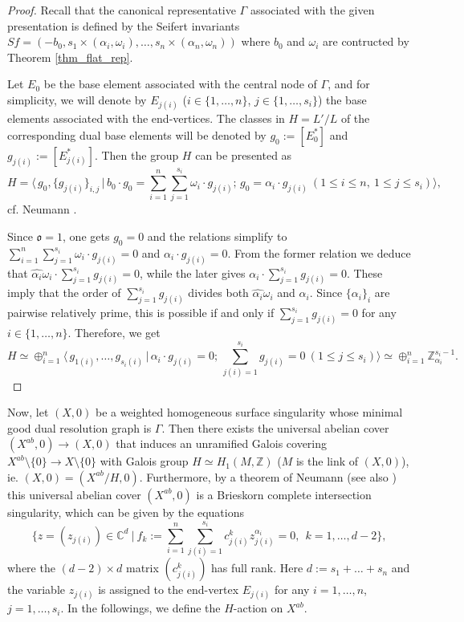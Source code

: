 \documentclass[oneside]{amsart}
\numberwithin{equation}{section}
\numberwithin{equation}{subsection}
\theoremstyle{plain}
\theoremstyle{definition}
\def\C{\mathbb C}
\def\Z{\mathbb Z}
\newcommand{\w}{\omega}
\newcommand{\al}{\alpha}
\renewcommand{\Z}{\mathbb{Z}}
\newcommand{\oo}{\mathfrak{o}}
\newcommand{\z}[1]{\widehat{#1}}
\begin{document}
\begin{proof}
Recall that the canonical representative $\Gamma$ associated with the given  presentation  is defined by the Seifert invariants $Sf=(-b_0, s_1\times (\al_i,\w_i),\dots,s_n\times (\al_n,\w_n))$ where $b_0$ and $\w_i$ are contructed by Theorem \ref{thm_flat_rep}.

Let $E_0$ be the base element associated with the central node of $\Gamma$, and for simplicity, we will denote by $E_{j(i)}$ ($i\in\{1,\dots,n\}$, $j\in\{1,\dots,s_i\}$) the base elements associated with the end-vertices. The classes in $H= L'/L$ of the corresponding dual base elements will be denoted by $g_0:=[E^*_0]$ and $g_{j(i)}:=[E^*_{j(i)}]$. Then the group $H$ can be presented as 
$$H=\big\langle \, g_0,\{g_{j(i)}\}_{i,j}\,|\, b_0\cdot g_0=\sum_{i=1}^n\sum_{j=1}^{s_i} \omega_i\cdot g_{j(i)};
\, g_0=\alpha_i\cdot g_{j(i)}\ (1\leq i\leq n, \ 1\leq j\leq s_i)\big\rangle,$$
cf. Neumann \cite{neumann.abel}. 

Since $\oo=1$, one gets $g_0=0$ and the relations simplify to  $\sum_{i=1}^n\sum_{j=1}^{s_i} \omega_i\cdot g_{j(i)}=0$ and $\alpha_i\cdot g_{j(i)}=0$. From the former relation we deduce that $\z{\al_i}\w_i\cdot \sum_{j=1}^{s_i}g_{j(i)}=0$, while the later gives $\al_i\cdot \sum_{j=1}^{s_i}g_{j(i)}=0$. These imply that the order of $\sum_{j=1}^{s_i}g_{j(i)}$ divides both $\z{\al_i}\w_i$ and $\al_i$. Since $\{\al_i\}_i$ are pairwise relatively prime, this is possible if and only if $\sum_{j=1}^{s_i}g_{j(i)}=0$ for any $i\in\{1,\dots, n\}$. Therefore, we get 
\begin{equation}\label{eq:Hrel}
H\simeq \oplus_{i=1}^n\langle \, g_{1(i)},\dots,g_{s_i(i)}\,|\, \alpha_i\cdot g_{j(i)}=0;
\, \sum_{j(i)=1}^{s_i}g_{j(i)}=0\ (1\leq j\leq s_i)\rangle\simeq \oplus_{i=1}^n \Z_{\al_i}^{s_i-1}.
\end{equation}
\end{proof}

Now, let $(X,0)$ be a weighted homogeneous surface singularity whose minimal good dual resolution graph is $\Gamma$. Then there exists the universal abelian cover $(X^{ab},0)\to (X,0)$ that induces an unramified Galois covering $X^{ab}\setminus\{0\} \to X\setminus\{0\}$ with Galois group $H\simeq H_1(M,\Z)$ ($M$ is the link of $(X,0)$), ie. $(X,0)=(X^{ab}/H,0)$. Furthermore, by a theorem of Neumann \cite{neumann.abel} (see also \cite[5.1.40]{nembook}) this universal abelian cover $(X^{ab},0)$ is a Brieskorn complete intersection singularity, which can be given by the equations   
\begin{equation}\label{eq:Xab}
\{z=(z_{j(i)})\in \C^d \ | \ f_k:=\sum_{i=1}^n \sum_{j(i)=1}^{s_i} c^k_{j(i)} z_{j(i)}^{\al_i}=0, \ \ k=1,\dots, d-2\},
\end{equation}
where the $(d-2)\times d$ matrix $(c^k_{j(i)})$ has full rank. Here $d:=s_1+\dots +s_n$ and the variable $z_{j(i)}$ is assigned to the end-vertex $E_{j(i)}$ for any $i=1,\dots,n$, $j=1,\dots, s_i$. In the followings, we define the $H$-action on $X^{ab}$.
\end{document}
